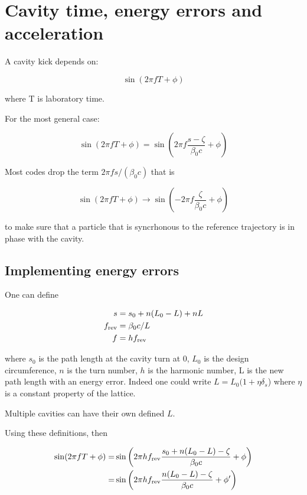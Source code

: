 \section{Cavity time, energy errors and acceleration}

A cavity kick depends on:

\begin{equation}
\sin(2 \pi f T + \phi)
\end{equation}

where T is laboratory time.


For the most general case:

\begin{equation}
\sin(2 \pi f T + \phi) = \sin\left(2 \pi f \frac{s-\zeta}{\beta_0 c}  + \phi \right)
\end{equation}

Most codes drop the term $2 \pi f s / (\beta_0 c)$ that is

\begin{equation}
\sin(2 \pi f T + \phi) \to  \sin\left(- 2 \pi f \frac{\zeta}{\beta_0 c} + \phi\right)
\end{equation}

to make sure that a particle that is syncrhonous to the reference trajectory is in phase with the cavity.


\subsection{Implementing energy errors} 

One can define

\begin{equation}
\begin{aligned}
s &= s_0 + n (L_0-L) + n L\\
f_{\rm rev} &= \beta_0 c / L\\ 
f &= h f_{\rm rev}
\end{aligned}
\end{equation}

where $s_0$ is the path length at the cavity turn at 0, $L_0$ is the design circumference, $n$ is the turn number, $h$ is the harmonic number, L is the new path length with an energy error. Indeed one could write $L=L_0(1 +\eta \delta_s$) where $\eta$ is a constant property of the lattice.

Multiple cavities can have their own defined $L$.

Using these definitions, then


\begin{align}
\sin(2 \pi f T + \phi) =
&\sin\left(2 \pi h f_{\rm rev} \frac{s_0 + n(L_0-L) -\zeta}{\beta_0 c}  + \phi\right)\\
=&\sin\left(2 \pi h f_{\rm rev} \frac{n(L_0-L) -\zeta}{\beta_0 c}  + \phi'\right)
\end{align}


